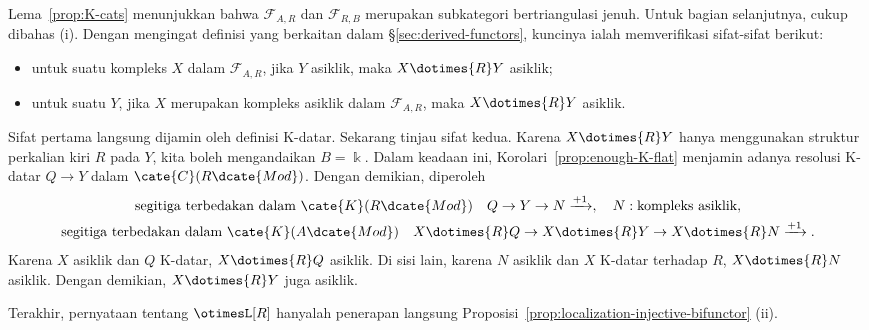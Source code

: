 \begin{bukti}
	Lema~\ref{prop:K-cats} menunjukkan bahwa $\mathcal{F}_{A,R}$ dan
	$\mathcal{F}_{R,B}$ merupakan subkategori bertriangulasi jenuh. Untuk bagian
	selanjutnya, cukup dibahas (i). Dengan mengingat definisi yang berkaitan dalam
	\S\ref{sec:derived-functors}, kuncinya ialah memverifikasi sifat-sifat berikut:
	\begin{itemize}
		\item untuk suatu kompleks $X$ dalam $\mathcal{F}_{A,R}$, jika $Y$
		asiklik, maka $X\dotimes{R}Y$ asiklik;
		\item untuk suatu $Y$, jika $X$ merupakan kompleks asiklik dalam
		$\mathcal{F}_{A,R}$, maka $X\dotimes{R}Y$ asiklik.
	\end{itemize}

	Sifat pertama langsung dijamin oleh definisi K-datar. Sekarang tinjau sifat
	kedua. Karena $X\dotimes{R}Y$ hanya menggunakan struktur perkalian kiri $R$
	pada $Y$, kita boleh mengandaikan $B=\Bbbk$. Dalam keadaan ini,
	Korolari~\ref{prop:enough-K-flat} menjamin adanya resolusi K-datar
	$Q\to Y$ dalam $\cate{C}(R\dcate{Mod})$. Dengan demikian, diperoleh
	\begin{gather*}
		\text{segitiga terbedakan dalam }\cate{K}(R\dcate{Mod}) \quad Q \to Y \to N \xrightarrow{+1}, \quad N: \text{kompleks asiklik}, \\
		\text{segitiga terbedakan dalam }\cate{K}(A\dcate{Mod}) \quad X \dotimes{R} Q \to X \dotimes{R} Y \to X \dotimes{R} N \xrightarrow{+1}.
	\end{gather*}
	Karena $X$ asiklik dan $Q$ K-datar, $X\dotimes{R}Q$ asiklik. Di sisi lain,
	karena $N$ asiklik dan $X$ K-datar terhadap $R$, $X\dotimes{R}N$ asiklik.
	Dengan demikian, $X\dotimes{R}Y$ juga asiklik.

	Terakhir, pernyataan tentang $\otimesL[R]$ hanyalah penerapan langsung
	Proposisi~\ref{prop:localization-injective-bifunctor} (ii).
\end{bukti}

